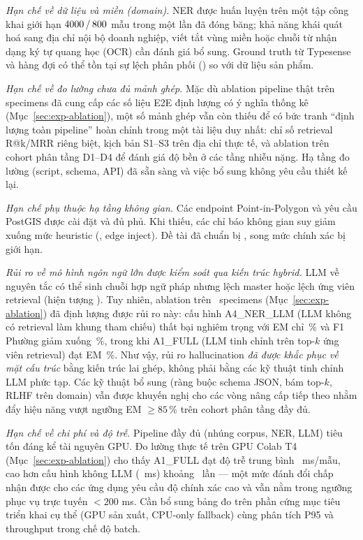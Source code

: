 \emph{Hạn chế về dữ liệu và miền (domain).} NER được huấn luyện trên một tập công khai giới hạn \(4000\,/\,800\) mẫu trong một lần đã đóng băng; khả năng khái quát hoá sang địa chỉ nội bộ doanh nghiệp, viết tắt vùng miền hoặc chuỗi từ nhận dạng ký tự quang học (OCR) cần đánh giá bổ sung. Ground truth từ Typesense và hàng đợi có thể tồn tại sự lệch phân phối () so với dữ liệu sản phẩm.

\emph{Hạn chế về đo lường chưa đủ mảnh ghép.} Mặc dù ablation pipeline thật trên \VNAIABLATIONTotalSpecimens\, specimens đã cung cấp các số liệu E2E định lượng có ý nghĩa thống kê (Mục~\ref{sec:exp-ablation}), một số mảnh ghép vẫn còn thiếu để có bức tranh ``định lượng toàn pipeline'' hoàn chỉnh trong một tài liệu duy nhất: chỉ số retrieval R@k/MRR riêng biệt, kịch bản S1--S3 trên địa chỉ thực tế, và ablation trên cohort phân tầng D1--D4 để đánh giá độ bền ở các tầng nhiễu nặng. Hạ tầng đo lường (script, schema, API) đã sẵn sàng và việc bổ sung không yêu cầu thiết kế lại.

\emph{Hạn chế phụ thuộc hạ tầng không gian.} Các endpoint Point-in-Polygon và  yêu cầu PostGIS được cài đặt và  đủ phủ. Khi thiếu, các chỉ báo không gian suy giảm xuống mức heuristic (, edge inject). Đề tài đã chuẩn bị , song mức chính xác bị giới hạn.

\emph{Rủi ro về mô hình ngôn ngữ lớn được kiểm soát qua kiến trúc hybrid.} LLM về nguyên tắc có thể sinh chuỗi hợp ngữ pháp nhưng lệch master hoặc lệch ứng viên retrieval (hiện tượng ). Tuy nhiên, ablation trên \VNAIABLATIONTotalSpecimens\, specimens (Mục~\ref{sec:exp-ablation}) đã định lượng được rủi ro này: cấu hình A4\_NER\_LLM (LLM không có retrieval làm khung tham chiếu) thất bại nghiêm trọng với EM chỉ \VNAIABLATIONAFourEMvTwoPct\,\% và F1 Phường giảm xuống \VNAIABLATIONAFourFOneWardPct\,\%, trong khi A1\_FULL (LLM tinh chỉnh trên top-\(k\) ứng viên retrieval) đạt EM \VNAIABLATIONAOneEMvTwoPct\,\%. Như vậy, rủi ro hallucination \emph{đã được khắc phục về mặt cấu trúc} bằng kiến trúc lai ghép, không phải bằng các kỹ thuật tinh chỉnh LLM phức tạp. Các kỹ thuật bổ sung (ràng buộc schema JSON,  bám top-\(k\), RLHF trên domain) vẫn được khuyến nghị cho các vòng nâng cấp tiếp theo nhằm đẩy hiệu năng vượt ngưỡng EM \(\geq 85\,\%\) trên cohort phân tầng đầy đủ.

\emph{Hạn chế về chi phí và độ trễ.} Pipeline đầy đủ (nhúng corpus, NER, LLM) tiêu tốn đáng kể tài nguyên GPU. Đo lường thực tế trên GPU Colab T4 (Mục~\ref{sec:exp-ablation}) cho thấy A1\_FULL đạt độ trễ trung bình \VNAIABLATIONAOneLatencyMs\, ms/mẫu, cao hơn cấu hình không LLM (\VNAIABLATIONATwoLatencyMs\, ms) khoảng \VNAIABLATIONLatencyOverheadFactor\, lần --- một mức đánh đổi chấp nhận được cho các ứng dụng yêu cầu độ chính xác cao và vẫn nằm trong ngưỡng phục vụ trực tuyến \(< 200\) ms. Cần bổ sung bảng đo trên phần cứng mục tiêu triển khai cụ thể (GPU sản xuất, CPU-only fallback) cùng phân tích P95 và throughput trong chế độ batch.

